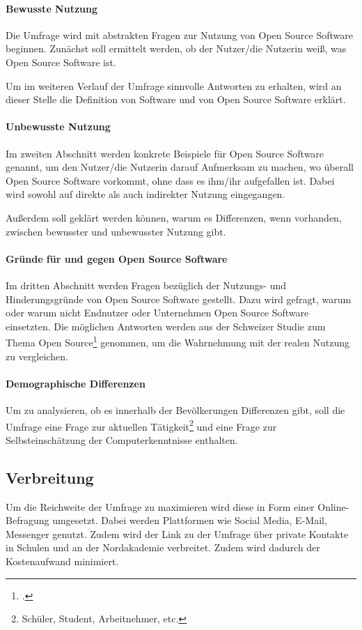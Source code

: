 \documentclass[a4paper]{article}
\begin{document}
		\paragraph{Bewusste Nutzung}
			Die Umfrage wird mit abstrakten Fragen zur Nutzung von Open Source Software beginnen. Zunächst soll ermittelt werden, ob der Nutzer/die Nutzerin weiß, was Open Source Software ist.
		
			Um im weiteren Verlauf der Umfrage sinnvolle Antworten zu erhalten, wird an dieser Stelle die Definition von Software und von Open Source Software erklärt.
		
		
		\paragraph{Unbewusste Nutzung}
			Im zweiten Abschnitt werden konkrete Beispiele für Open Source Software genannt, um den Nutzer/die Nutzerin  darauf Aufmerksam zu machen, wo überall Open Source Software vorkommt, ohne dass es ihm/ihr aufgefallen ist. Dabei wird sowohl auf direkte als auch indirekter Nutzung eingegangen.
		
			Außerdem soll geklärt werden können, warum es Differenzen, wenn vorhanden, zwischen bewusster und unbewusster Nutzung gibt.
		
		\paragraph{Gründe für und gegen Open Source Software}
			Im dritten Abschnitt werden Fragen bezüglich der Nutzungs- und Hinderungsgründe von Open Source Software gestellt. Dazu wird gefragt, warum oder warum nicht Endnutzer oder Unternehmen Open Source Software einsetzten. Die möglichen Antworten werden aus der Schweizer Studie zum Thema Open Source\footcite{oss:studie} genommen, um die Wahrnehmung mit der realen Nutzung zu vergleichen.
		
		\paragraph{Demographische Differenzen}
			Um zu analysieren, ob es innerhalb der Bevölkerungen Differenzen gibt, soll die Umfrage eine Frage zur aktuellen Tätigkeit\footnote{Schüler, Student, Arbeitnehmer, etc.} und eine Frage zur Selbsteinschätzung der Computerkenntnisse enthalten.
			
		\subsection{Verbreitung}
			Um die Reichweite der Umfrage zu maximieren wird diese in Form einer Online-Befragung umgesetzt. Dabei werden Plattformen wie Social Media, E-Mail, Messenger genutzt. Zudem wird der Link zu der Umfrage über private Kontakte in Schulen und an der Nordakademie verbreitet. Zudem wird dadurch der Kostenaufwand minimiert.
	   
\end{document}
